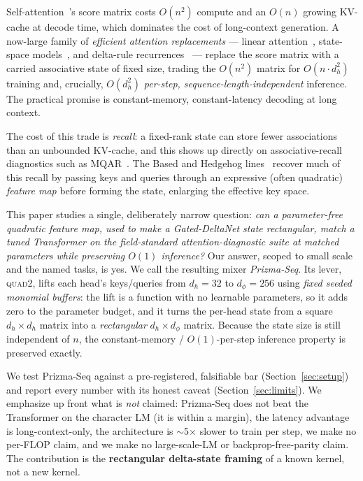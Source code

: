 \documentclass[11pt]{article}
\newcommand{\dphi}{d_{\phi}}
\newcommand{\dhd}{d_{h}}
\newcommand{\quadtwo}{\textsc{quad2}}
\begin{document}
Self-attention~\cite{vaswani2017attention}'s score matrix costs $O(n^2)$ compute and an $O(n)$
growing KV-cache at decode time, which dominates the cost of long-context generation. A now-large family of \emph{efficient
attention replacements} --- linear attention~\cite{katharopoulos2020transformers}, state-space
models~\cite{gu2022s4,gu2024mamba}, and delta-rule recurrences~\cite{yang2024deltanet,
yang2024gateddeltanet} --- replace the score matrix with a carried associative state of fixed size,
trading the $O(n^2)$ matrix for $O(n\cdot\dhd^2)$ training and, crucially, $O(\dhd^2)$
\emph{per-step, sequence-length-independent} inference. The practical promise is constant-memory,
constant-latency decoding at long context.

The cost of this trade is \emph{recall}: a fixed-rank state can store fewer associations than an
unbounded KV-cache, and this shows up directly on associative-recall diagnostics such as
MQAR~\cite{arora2024zoology}. The Based and Hedgehog lines~\cite{arora2024based,zhang2024hedgehog}
recover much of this recall by passing keys and queries through an expressive (often quadratic)
\emph{feature map} before forming the state, enlarging the effective key space.

This paper studies a single, deliberately narrow question: \emph{can a parameter-free quadratic
feature map, used to make a Gated-DeltaNet state rectangular, match a tuned Transformer on the
field-standard attention-diagnostic suite at matched parameters while preserving $O(1)$
inference?} Our answer, scoped to small scale and the named tasks, is yes. We call the resulting
mixer \emph{Prizma-Seq}. Its lever, \quadtwo, lifts each head's keys/queries from $\dhd{=}32$ to
$\dphi{=}256$ using \emph{fixed seeded monomial buffers}: the lift is a function with no learnable
parameters, so it adds zero to the parameter budget, and it turns the per-head state from a square
$\dhd\times\dhd$ matrix into a \emph{rectangular} $\dhd\times\dphi$ matrix. Because the state size is
still independent of $n$, the constant-memory / $O(1)$-per-step inference property is preserved
exactly.

We test Prizma-Seq against a pre-registered, falsifiable bar (Section~\ref{sec:setup}) and report
every number with its honest caveat (Section~\ref{sec:limits}). We emphasize up front what is
\emph{not} claimed: Prizma-Seq does not beat the Transformer on the character LM (it is within a
margin), the latency advantage is long-context-only, the architecture is $\sim$5$\times$ slower to
train per step, we make no per-FLOP claim, and we make no large-scale-LM or backprop-free-parity
claim. The contribution is the \textbf{rectangular delta-state framing} of a known kernel, not a
new kernel.
\end{document}
